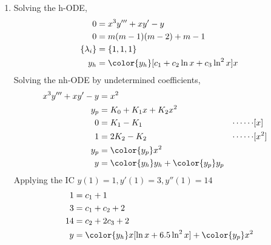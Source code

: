 \begin{enumerate}
    \item Solving the h-ODE,
          \begin{align}
              0               & = x^{3}y''' + xy' - y                            \\
              0               & = m(m-1) (m-2) + m - 1                           \\
              \{\lambda_{i}\} & = \{1, 1, 1\}                                    \\
              y_{h}           & = \color{y_h} [c_1 + c_2 \ln x + c_3 \ln^{2}x] x
          \end{align}
          Solving the nh-ODE by undetermined coefficients,
          \begin{align}
              x^{3}y''' + xy' - y & = x^{2}                                                              \\
              y_{p}               & = K_0 + K_1 x + K_2 x^{2}                                            \\
              0                   & = K_1 - K_1                                 & \cdots\cdots & [x]     \\
              1                   & = 2K_2 - K_2                                & \cdots\cdots & [x^{2}] \\
              y_{p}               & = \color{y_p} x^{2}                                                  \\
              y                   & = {\color{y_h} y_{h}} + {\color{y_p} y_{p}}
          \end{align}
          Applying the IC $ y(1) = 1, y'(1) = 3, y''(1) = 14 $
          \begin{align}
              1  & = c_1 + 1                                                    \\
              3  & = c_1 + c_2 + 2                                              \\
              14 & = c_2 + 2c_3 + 2                                             \\
              y  & = {\color{y_h} x[\ln x + 6.5\ln^{2}x]} + {\color{y_p} x^{2}}
          \end{align}
          \begin{figure}[H]
              \centering
              \begin{tikzpicture}[
                      declare function = {
                              y_p = x^(2);
                              y_h = x*ln(x)*(1 + 6.5*ln(x));
                          }
                  ]

\end{tikzpicture}
\end{figure}
\end{enumerate}

